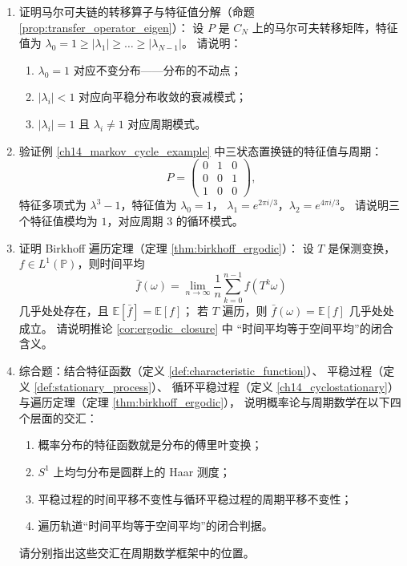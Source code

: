 \begin{enumerate}[leftmargin=3em, label=\textbf{题 \arabic*}]
    \item 证明马尔可夫链的转移算子与特征值分解（命题 \ref{prop:transfer_operator_eigen}）：
    设 $P$ 是 $C_N$ 上的马尔可夫转移矩阵，特征值为
    $\lambda_0=1\ge|\lambda_1|\ge\dots\ge|\lambda_{N-1}|$。
    请说明：
    \begin{enumerate}[label=(\roman*)]
        \item $\lambda_0=1$ 对应不变分布——分布的不动点；
        \item $|\lambda_i|<1$ 对应向平稳分布收敛的衰减模式；
        \item $|\lambda_i|=1$ 且 $\lambda_i\neq1$ 对应周期模式。
    \end{enumerate}

    \item 验证例 \ref{ch14_markov_cycle_example} 中三状态置换链的特征值与周期：
    \[
    P=\begin{pmatrix}0&1&0\\0&0&1\\1&0&0\end{pmatrix},
    \]
    特征多项式为 $\lambda^3-1$，特征值为 $\lambda_0=1$，
    $\lambda_1=e^{2\pi i/3}$，$\lambda_2=e^{4\pi i/3}$。
    请说明三个特征值模均为 $1$，对应周期 $3$ 的循环模式。

    \item 证明 Birkhoff 遍历定理（定理 \ref{thm:birkhoff_ergodic}）：
    设 $T$ 是保测变换，$f\in L^1(\mathbb{P})$，则时间平均
    \[
    \bar{f}(\omega)=\lim_{n\to\infty}\frac{1}{n}\sum_{k=0}^{n-1}f(T^k\omega)
    \]
    几乎处处存在，且 $\mathbb{E}[\bar{f}]=\mathbb{E}[f]$；
    若 $T$ 遍历，则 $\bar{f}(\omega)=\mathbb{E}[f]$ 几乎处处成立。
    请说明推论 \ref{cor:ergodic_closure} 中
    “时间平均等于空间平均”的闭合含义。

    \item 综合题：结合特征函数（定义 \ref{def:characteristic_function}）、
    平稳过程（定义 \ref{def:stationary_process}）、
    循环平稳过程（定义 \ref{ch14_cyclostationary}）
    与遍历定理（定理 \ref{thm:birkhoff_ergodic}），
    说明概率论与周期数学在以下四个层面的交汇：
    \begin{enumerate}[label=(\roman*)]
        \item 概率分布的特征函数就是分布的傅里叶变换；
        \item $S^1$ 上均匀分布是圆群上的 Haar 测度；
        \item 平稳过程的时间平移不变性与循环平稳过程的周期平移不变性；
        \item 遍历轨道“时间平均等于空间平均”的闭合判据。
    \end{enumerate}
    请分别指出这些交汇在周期数学框架中的位置。
\end{enumerate}

